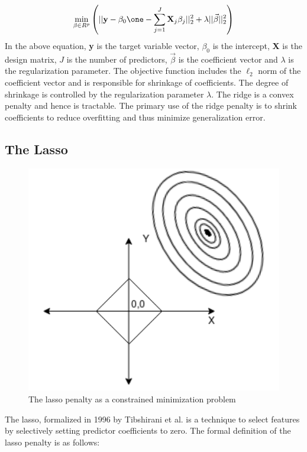 \documentclass[a4paper,12pt]{article}
\begin{document}
\begin{eqnarray}
\label{eq:6}
\min_{\beta\in R^p}\left(|| \textbf{y}-\beta_0\one-\sum_{j=1}^J
\textbf{X}_j\beta_j||_2^2 + \lambda ||\vec{\beta}||_2^2 \right)
\end{eqnarray}
In the above equation, \textbf{y} is the target variable vector, $\beta_0$ is the intercept, \textbf{X} is the design matrix, $J$ is the number of predictors, $\vec{\beta}$ is the coefficient vector and $\lambda$ is the regularization parameter. The objective function includes the $\ell_2$ norm of the coefficient vector and is responsible for shrinkage of coefficients. The degree of shrinkage is controlled by the regularization parameter $\lambda$. The ridge is a convex penalty and hence is tractable. The primary use of the ridge penalty is to shrink coefficients to reduce overfitting and thus minimize generalization error\cite{saunders1998ridge}. 


\newpage
\subsection{The Lasso}

\begin{figure}[H]
    \centering
    \includegraphics[scale=0.4]{lasso.png}
    \caption{The lasso penalty as a constrained minimization problem}
    \label{fig:ALAMO Flowchart}
\end{figure}

The lasso, formalized in 1996 by Tibshirani et al.\cite{tibshirani1996regression} is a technique to select features by selectively setting predictor coefficients to zero. The formal definition of the lasso penalty is as follows:
\end{document}
